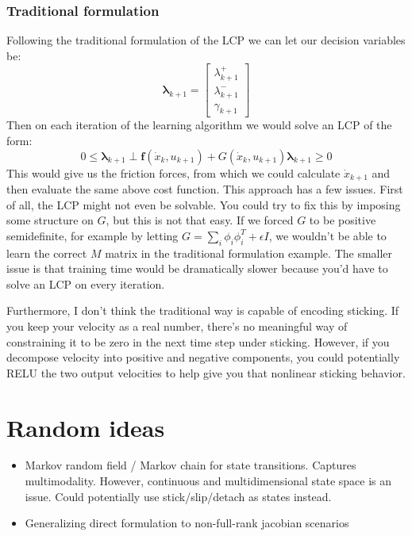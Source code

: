 \documentclass{article}
\renewcommand{\vec}[1]{\boldsymbol{#1}}
\begin{document}
\subsubsection{Traditional formulation}
Following the traditional formulation of the LCP we can let our decision variables be:
\[
    \vec{\lambda}_{k+1} =
    \begin{bmatrix}
        \lambda^+_{k+1} \\
        \lambda^-_{k+1} \\
        \gamma_{k+1}
    \end{bmatrix}
\]
Then on each iteration of the learning algorithm we would solve an LCP of the form:
\[
    0 \leq \vec{\lambda}_{k+1} \perp \vec{f}(\dot x_k, u_{k+1}) + G(\dot x_k, u_{k+1}) \vec{\lambda}_{k+1} \geq 0
\]
This would give us the friction forces, from which we could calculate $\dot x_{k+1}$ and then evaluate the same above cost function. This approach has a few issues. First of all, the LCP might not even be solvable. You could try to fix this by imposing some structure on $G$, but this is not that easy. If we forced $G$ to be positive semidefinite, for example by letting $G = \sum _i \phi_i \phi_i^T + \epsilon I$, we wouldn't be able to learn the correct $M$ matrix in the traditional formulation example. The smaller issue is that training time would be dramatically slower because you'd have to solve an LCP on every iteration.

Furthermore, I don't think the traditional way is capable of encoding sticking. If you keep your velocity as a real number, there's no meaningful way of constraining it to be zero in the next time step under sticking. However, if you decompose velocity into positive and negative components, you could potentially RELU the two output velocities to help give you that nonlinear sticking behavior.

\section{Random ideas}
\begin{itemize}
    \item Markov random field / Markov chain for state transitions. Captures multimodality. However, continuous and multidimensional state space is an issue. Could potentially use stick/slip/detach as states instead.
    \item Generalizing direct formulation to non-full-rank jacobian scenarios
\end{itemize}
\end{document}
